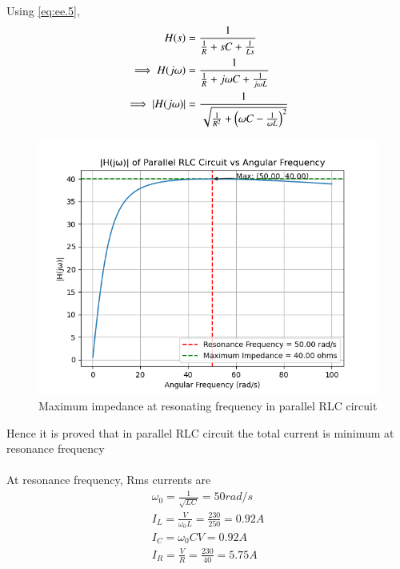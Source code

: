 \documentclass[journal,12pt,twocolumn]{IEEEtran}
\theoremstyle{remark}
\begin{document}
Using \eqref{eq:ee.5},
\begin{align}
     H(s) &=\frac{1}{\frac{1}{R} + sC + \frac{1}{Ls}}\\
     \implies H(j\omega) &=\frac{1}{\frac{1}{R} + j\omega C + \frac{1}{j\omega L}}\\
     \implies \left\vert H(j\omega)\right\vert &= \frac{1}{\sqrt{\frac{1}{R^2} +\left(\omega C - \frac{1}{\omega L}\right)^2}}
\end{align}
\begin{figure}[!ht]
    \centering
    \includegraphics[width=1\linewidth]{figs/m.png}
    \caption{Maximum impedance at resonating frequency in parallel RLC circuit}
\end{figure}

Hence it is proved that in parallel RLC circuit the total current is minimum at resonance frequency\\
   \\
  At resonance frequency, Rms currents are\\
\begin{align}
\omega_0=\frac{1}{\sqrt{LC}}= 50rad/s\\
   I_L=\frac{V}{\omega_0L}=\frac{230}{250}=0.92A\\
   I_C=\omega_0CV= 0.92 A\\
   I_R=\frac{V}{R}=\frac{230}{40}=5.75A
 \end{align}
 
\end{document}
